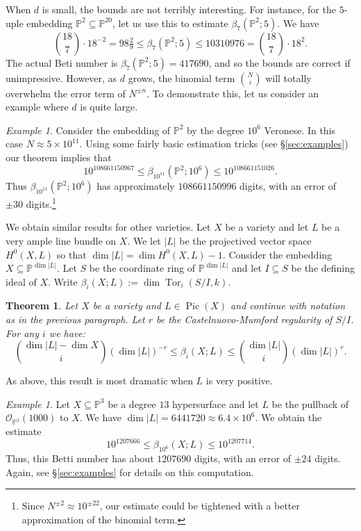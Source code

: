 \documentclass[12pt]{amsart}
\newtheorem{thm}[lemma]{Theorem}
\theoremstyle{remark}
\newtheorem{example}[lemma]{Example}
\newcommand{\Tor}{\operatorname{Tor}}
\newcommand{\Pic}{\operatorname{Pic}}
\newcommand{\cO}{{\mathcal O}}
\newcommand{\PP}{\mathbb P}
\begin{document}
When $d$ is small, the bounds are not terribly interesting.
For instance, for the $5$-uple embedding $\PP^2\subseteq \PP^{20}$, let us use this to estimate $\beta_7(\PP^2; 5)$.  We have
\[
\binom{18}{7}\cdot 18^{-2} = 98 \tfrac{2}{9} \leq \beta_7(\PP^2; 5)\leq 10310976 = \binom{18}{7}\cdot 18^2.
\]
The actual Beti number is $\beta_7(\PP^2; 5)=417690$, and so the bounds are correct if unimpressive.
However, as $d$ grows, the binomial term $\binom{N}{i}$ will totally overwhelm the error term of $N^{\pm n}$.
To demonstrate this, let us consider an example where $d$ is quite large.
\begin{example}\label{ex:P2million}
Consider the embedding of $\PP^2$  by the degree $10^6$ Veronese.  In this case $N\approx 5 \times 10^{11}$.  
Using some fairly basic estimation tricks (see \S\ref{sec:examples}) our theorem implies that
\[
10^{108661150967}\leq  \beta_{10^{11}}(\PP^2; 10^6)\leq 10^{108661151026}.
\]
Thus $\beta_{10^{11}}(\PP^2; 10^6)$ has approximately $108661150996$ digits, with an error of $\pm 30$ digits.\footnote{Since $N^{\pm 2} \approx 10^{\pm 22}$, our estimate could be tightened with a better approximation of the binomial term.}
\end{example}

We obtain similar results for other varieties.  Let $X$ be a variety and let $L$ be a very ample line bundle on $X$.  We let $|L|$ be the projectived vector space $H^0(X,L)$ so that $\dim |L| = \dim H^0(X,L)-1$.  Consider the embedding $X\subseteq \PP^{\dim |L|}$.  Let $S$ be the coordinate ring of $\PP^{\dim |L|}$ and let $I\subseteq S$ be the defining ideal of $X$.  Write $\beta_i(X;L):= \dim \Tor_i(S/I,k)$.
\begin{thm}\label{thm:varieties}
Let $X$ be a variety and $L\in \Pic(X)$ and continue with notation as in the previous paragraph.  Let $r$ be the Castelnuovo-Mumford regularity of $S/I$.
For any $i$ we have:
\[
\binom{\dim |L| -\dim X}{i}(\dim |L|)^{-r} \leq \beta_i(X;L) \leq \binom{\dim |L|}{i}(\dim |L|)^{r}.
\]
\end{thm}
As above, this result is most dramatic when $L$ is very positive.
\begin{example}\label{ex:hypersurface}
Let $X\subseteq \PP^3$ be a degree $13$ hypersurface and let $L$ be the pullback of $\cO_{\PP^3}(1000)$ to $X$.  We have $\dim |L|=6441720\approx 6.4\times 10^{6}$.  
We obtain the estimate
\[
10^{1207666} \leq  \beta_{10^{6}}(X; L) \leq 10^{1207714}.
\]
Thus, this Betti number has about $1207690$ digits, with an error of $\pm 24$ digits.  Again, see \S\ref{sec:examples} for details on this computation.
\end{example}
\end{document}
